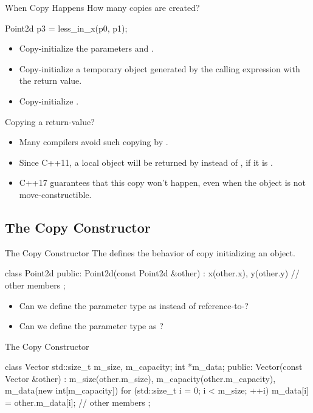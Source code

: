 \documentclass{beamer}
\begin{document}
\begin{frame}[fragile]{When Copy Happens}
    How many copies are created?
    \begin{cpp}
Point2d p3 = less_in_x(p0, p1);
    \end{cpp}
    \pause
    \begin{itemize}
        \item Copy-initialize the parameters  and .
        \item Copy-initialize a temporary object generated by the calling expression with the return value. 
        \item Copy-initialize . 
    \end{itemize}
    \pause
    Copying a return-value?
    \begin{itemize}
        \item Many compilers avoid such copying by .
        \item Since C++11, a local object will be returned by  instead of , if it is .
        \item C++17 guarantees that this copy won't happen, even when the object is not move-constructible.
    \end{itemize}
\end{frame}

\subsection{The Copy Constructor}

\begin{frame}[fragile]{The Copy Constructor}
    The  defines the behavior of copy initializing an object.
    \begin{cpp}
class Point2d {
 public:
  Point2d(const Point2d &other)
    : x(other.x), y(other.y) {}
  // other members
};
    \end{cpp}
    \pause
    \begin{itemize}
        \item Can we define the parameter type as  instead of reference-to-?
        \item Can we define the parameter type as ?
    \end{itemize}
\end{frame}

\begin{frame}[fragile]{The Copy Constructor}
    \begin{cpp}
class Vector {
  std::size_t m_size, m_capacity;
  int *m_data;
 public:
  Vector(const Vector &other)
    : m_size(other.m_size),
      m_capacity(other.m_capacity),
      m_data(new int[m_capacity]{}) {
    for (std::size_t i = 0; i < m_size; ++i)
      m_data[i] = other.m_data[i];
  }
  // other members
};
    \end{cpp}
\end{frame}
\end{document}
